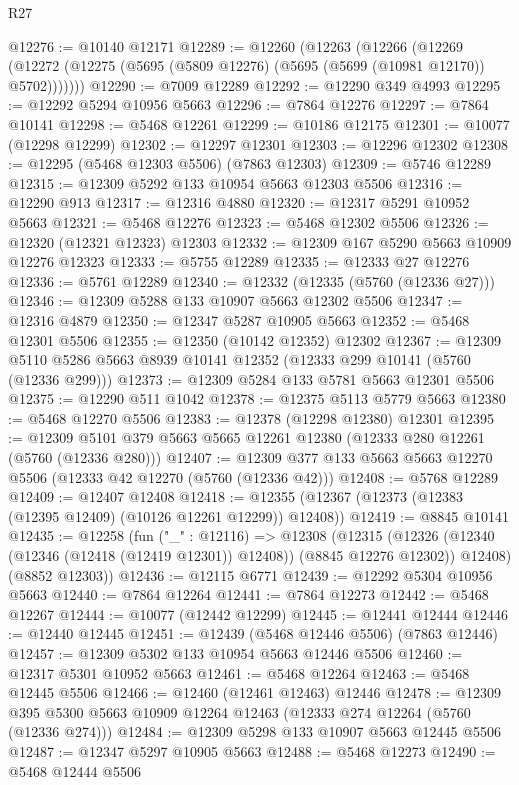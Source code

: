 \begin{lexlean}{R27}
\begin{coremodule}
@12276 := @10140 @12171
@12289 := @12260
    (@12263
      (@12266
        (@12269 (@12272 (@12275 (@5695 (@5809 @12276) (@5695 (@5699 (@10981 @12170)) @5702)))))))
@12290 := @7009 @12289
@12292 := @12290 @349 @4993
@12295 := @12292 @5294 @10956 @5663
@12296 := @7864 @12276
@12297 := @7864 @10141
@12298 := @5468 @12261
@12299 := @10186 @12175
@12301 := @10077 (@12298 @12299)
@12302 := @12297 @12301
@12303 := @12296 @12302
@12308 := @12295 (@5468 @12303 @5506) (@7863 @12303)
@12309 := @5746 @12289
@12315 := @12309 @5292 @133 @10954 @5663 @12303 @5506
@12316 := @12290 @913
@12317 := @12316 @4880
@12320 := @12317 @5291 @10952 @5663
@12321 := @5468 @12276
@12323 := @5468 @12302 @5506
@12326 := @12320 (@12321 @12323) @12303
@12332 := @12309 @167 @5290 @5663 @10909 @12276 @12323
@12333 := @5755 @12289
@12335 := @12333 @27 @12276
@12336 := @5761 @12289
@12340 := @12332 (@12335 (@5760 (@12336 @27)))
@12346 := @12309 @5288 @133 @10907 @5663 @12302 @5506
@12347 := @12316 @4879
@12350 := @12347 @5287 @10905 @5663
@12352 := @5468 @12301 @5506
@12355 := @12350 (@10142 @12352) @12302
@12367 := @12309 @5110 @5286 @5663 @8939 @10141 @12352 (@12333 @299 @10141 (@5760 (@12336 @299)))
@12373 := @12309 @5284 @133 @5781 @5663 @12301 @5506
@12375 := @12290 @511 @1042
@12378 := @12375 @5113 @5779 @5663
@12380 := @5468 @12270 @5506
@12383 := @12378 (@12298 @12380) @12301
@12395 := @12309 @5101 @379 @5663 @5665 @12261 @12380 (@12333 @280 @12261 (@5760 (@12336 @280)))
@12407 := @12309 @377 @133 @5663 @5663 @12270 @5506 (@12333 @42 @12270 (@5760 (@12336 @42)))
@12408 := @5768 @12289
@12409 := @12407 @12408
@12418 := @12355 (@12367 (@12373 (@12383 (@12395 @12409) (@10126 @12261 @12299)) @12408))
@12419 := @8845 @10141
@12435 := @12258
    (fun ("_" : @12116) =>
    @12308
      (@12315
        (@12326 (@12340 (@12346 (@12418 (@12419 @12301)) @12408)) (@8845 @12276 @12302))
        @12408)
      (@8852 @12303))
@12436 := @12115 @6771
@12439 := @12292 @5304 @10956 @5663
@12440 := @7864 @12264
@12441 := @7864 @12273
@12442 := @5468 @12267
@12444 := @10077 (@12442 @12299)
@12445 := @12441 @12444
@12446 := @12440 @12445
@12451 := @12439 (@5468 @12446 @5506) (@7863 @12446)
@12457 := @12309 @5302 @133 @10954 @5663 @12446 @5506
@12460 := @12317 @5301 @10952 @5663
@12461 := @5468 @12264
@12463 := @5468 @12445 @5506
@12466 := @12460 (@12461 @12463) @12446
@12478 := @12309 @395 @5300 @5663 @10909 @12264 @12463 (@12333 @274 @12264 (@5760 (@12336 @274)))
@12484 := @12309 @5298 @133 @10907 @5663 @12445 @5506
@12487 := @12347 @5297 @10905 @5663
@12488 := @5468 @12273
@12490 := @5468 @12444 @5506

\end{coremodule}
\end{lexlean}
